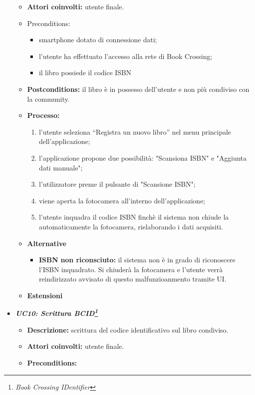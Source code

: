 \begin{itemize}
\begin{itemize}
		\item \textbf{Attori coinvolti:} utente finale.
		\item {Preconditions:} 
		\begin{itemize}
			\item smartphone dotato di connessione dati;
			\item l’utente ha effettuato l’accesso alla rete di Book Crossing;
			\item il libro possiede il codice ISBN
		\end{itemize}
		\item \textbf{Postconditions:} il libro è in possesso dell'utente e non più condiviso con la community.
		\item \textbf{Processo:}
		\begin{enumerate}
			\item l’utente seleziona “Registra un nuovo libro” nel menu principale dell’applicazione;
			\item l’applicazione propone due possibilità: "Scansiona ISBN" e "Aggiunta dati manuale";
			\item l'utilizzatore preme il pulsante di "Scansione ISBN";
			\item viene aperta la fotocamera all'interno dell'applicazione;
			\item l'utente inquadra il codice ISBN finchè il sistema non chiude la automaticamente la fotocamera, rielaborando i dati acquisiti.
		\end{enumerate}
		\item \textbf{Alternative}
		\begin{itemize}
			\item \textbf{ISBN non riconsciuto:} il sistema non è in grado di riconoscere l'ISBN inquadrato. Si chiuderà la fotocamera e l'utente verrà reindirizzato avvisato di questo malfunzioanmento tramite UI.
		\end{itemize}
		\item \textbf{Estensioni}
	\end{itemize}
	\item \textbf{\textit{UC10: Scrittura BCID\footnote{\textit{Book Crossing IDentifier}}}}
	\begin{itemize}
		\item \textbf{Descrizione:} scrittura del codice identificativo sul libro condiviso.
		\item \textbf{Attori coinvolti:} utente finale.
		\item \textbf{Preconditions:}
		\begin{itemize}

\end{itemize}
\end{itemize}
\end{itemize}
